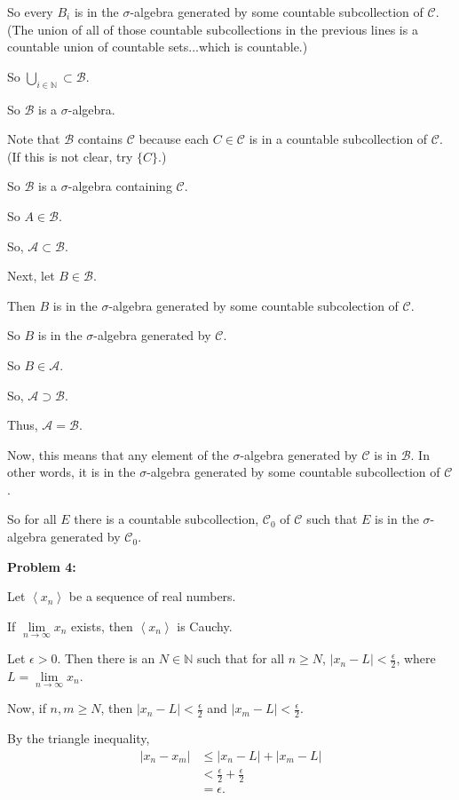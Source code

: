 \documentclass[a4paper,12pt]{article}
\newcommand{\tab}{\hspace{4mm}} %
\newcommand{\shunt}{\vspace{20mm}}
\newcommand{\absval}[1]{\lvert #1 \rvert}
\newcommand{\anbrack}[1]{\left\langle #1 \right\rangle}
\newcommand{\ep}{\epsilon}
\newcommand{\N}{\mathbb{N}}
\newcommand{\scrA}{\mathcal{A}}
\newcommand{\scrB}{\mathcal{B}}
\newcommand{\scrC}{\mathcal{C}}
\begin{document}
\tab \tab So every $B_i$ is in the $\sigma$-algebra generated by some countable subcollection of $\scrC$. (The union of all of those countable subcollections in the previous lines is a countable union of countable sets...which is countable.)

\tab \tab So $\bigcup\limits_{i \in \N} \subset \scrB$.

\tab So $\scrB$ is a $\sigma$-algebra.

\tab Note that $\scrB$ contains $\scrC$ because each $C \in \scrC$ is in a countable subcollection of $\scrC$. (If this is not clear, try $\{C\}$.)

\tab So $\scrB$ is a $\sigma$-algebra containing $\scrC$.

\tab So $A \in \scrB$.

So, $\scrA \subset \scrB$.

Next, let $B \in \scrB$.

\tab Then $B$ is in the $\sigma$-algebra generated by some countable subcolection of $\scrC$.

\tab So $B$ is in the $\sigma$-algebra generated by $\scrC$.

\tab So $B \in \scrA$.

So, $\scrA \supset \scrB$.

Thus, $\scrA = \scrB$.

Now, this means that any element of the $\sigma$-algebra generated by $\scrC$ is in $\scrB$. In other words, it is in the $\sigma$-algebra generated by some countable subcollection of $\scrC$.

So for all $E$ there is a countable subcollection, $\scrC_0$ of $\scrC$ such that $E$ is in the $\sigma$-algebra generated by $\scrC_0$.

\shunt

{\bf Problem 4:}

Let $\anbrack{x_n}$ be a sequence of real numbers.

If $\lim\limits_{n \to \infty} x_n$ exists, then $\anbrack{x_n}$ is Cauchy.

\tab Let $\ep >0$. Then there is an $N \in \N$ such that for all $n \geq N$, $\absval{x_n - L} < \frac{\ep}{2}$, where $L = \lim\limits_{n \to \infty} x_n$.

\tab Now, if $n,m \geq N$, then $\absval{x_n - L} < \frac{\ep}{2}$ and $\absval{x_m - L} < \frac{\ep}{2}$.

\tab By the triangle inequality,
\begin{align*}
\absval{x_n - x_m} &\leq \absval{x_n - L} + \absval{x_m -L} \\
&< \frac{\ep}{2} + \frac{\ep}{2} \\
&= \ep.
\end{align*}
\end{document}
